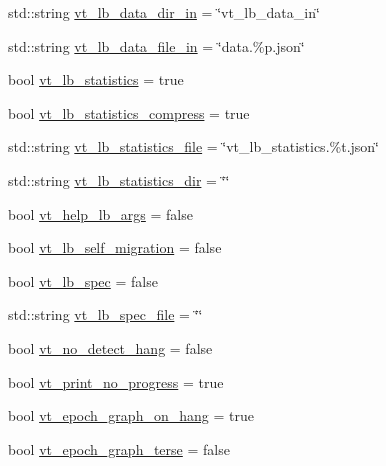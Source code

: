 \begin{DoxyCompactItemize}
\item 
std\+::string \hyperlink{structvt_1_1arguments_1_1_app_config_a2cc5cc4233969ea1e0ba153d5cf77f80}{vt\+\_\+lb\+\_\+data\+\_\+dir\+\_\+in} = \char`\"{}vt\+\_\+lb\+\_\+data\+\_\+in\char`\"{}
\item 
std\+::string \hyperlink{structvt_1_1arguments_1_1_app_config_a630f290b833799e6cf08a96585443aaf}{vt\+\_\+lb\+\_\+data\+\_\+file\+\_\+in} = \char`\"{}data.\%p.\+json\char`\"{}
\item 
bool \hyperlink{structvt_1_1arguments_1_1_app_config_a895853b39bd298996da1fb3eaba08210}{vt\+\_\+lb\+\_\+statistics} = true
\item 
bool \hyperlink{structvt_1_1arguments_1_1_app_config_a609872582f081dd85894afdac79717ff}{vt\+\_\+lb\+\_\+statistics\+\_\+compress} = true
\item 
std\+::string \hyperlink{structvt_1_1arguments_1_1_app_config_a443331f18b57f5c0e0e85deb2727d89a}{vt\+\_\+lb\+\_\+statistics\+\_\+file} = \char`\"{}vt\+\_\+lb\+\_\+statistics.\%t.\+json\char`\"{}
\item 
std\+::string \hyperlink{structvt_1_1arguments_1_1_app_config_ada6b65e4526bf9a809f6f601f8713e51}{vt\+\_\+lb\+\_\+statistics\+\_\+dir} = \char`\"{}\char`\"{}
\item 
bool \hyperlink{structvt_1_1arguments_1_1_app_config_a051fa77230596089ecb7b88cb62ae5bb}{vt\+\_\+help\+\_\+lb\+\_\+args} = false
\item 
bool \hyperlink{structvt_1_1arguments_1_1_app_config_a14f9206360ee902f908670fce103f96b}{vt\+\_\+lb\+\_\+self\+\_\+migration} = false
\item 
bool \hyperlink{structvt_1_1arguments_1_1_app_config_a96fe39162c5ec3f909e3b12a1cdb85f1}{vt\+\_\+lb\+\_\+spec} = false
\item 
std\+::string \hyperlink{structvt_1_1arguments_1_1_app_config_a4458b2db80357ede1542a435831311d3}{vt\+\_\+lb\+\_\+spec\+\_\+file} = \char`\"{}\char`\"{}
\item 
bool \hyperlink{structvt_1_1arguments_1_1_app_config_a5cab0e03f494700d6b27aff2c8a1399c}{vt\+\_\+no\+\_\+detect\+\_\+hang} = false
\item 
bool \hyperlink{structvt_1_1arguments_1_1_app_config_ab8b0ebcbe69f49e525bf5ce152ad43f5}{vt\+\_\+print\+\_\+no\+\_\+progress} = true
\item 
bool \hyperlink{structvt_1_1arguments_1_1_app_config_af7f54f986814f23a1c53932f8bf52e3c}{vt\+\_\+epoch\+\_\+graph\+\_\+on\+\_\+hang} = true
\item 
bool \hyperlink{structvt_1_1arguments_1_1_app_config_a25d80ec055614d39dd4039dde1faa94e}{vt\+\_\+epoch\+\_\+graph\+\_\+terse} = false

\end{DoxyCompactItemize}
